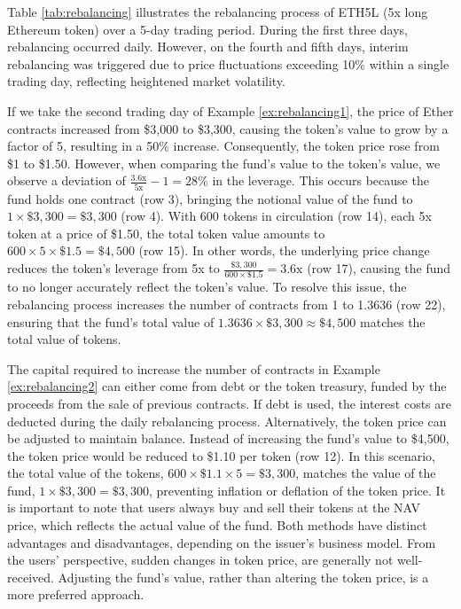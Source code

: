 \begin{example}\label{ex:rebalancing1}
	Table \ref{tab:rebalancing} illustrates the rebalancing process of ETH5L (5x long Ethereum token) over a 5-day trading period. During the first three days, rebalancing occurred daily. However, on the fourth and fifth days, interim rebalancing was triggered due to price fluctuations exceeding 10\% within a single trading day, reflecting heightened market volatility.
\end{example}


\begin{example}\label{ex:rebalancing2}
	If we take the second trading day of Example \ref{ex:rebalancing1}, the price of Ether contracts increased from \$3,000 to \$3,300, causing the token's value to grow by a factor of 5, resulting in a 50\% increase. Consequently, the token price rose from \$1 to \$1.50. However, when comparing the fund's value to the token's value, we observe a deviation of \(\frac{3.6\text{x}}{5\text{x}} - 1 = 28\%\) in the leverage. This occurs because the fund holds one contract (row 3), bringing the notional value of the fund to \(1 \times \$3,300 = \$3,300\) (row 4). With 600 tokens in circulation (row 14), each 5x token at a price of \$1.50, the total token value amounts to \(600 \times 5 \times \$1.5 = \$4,500\) (row 15). In other words, the underlying price change reduces the token's leverage from 5x to \(\frac{\$3,300}{600 \times \$1.5} = 3.6\text{x}\) (row 17), causing the fund to no longer accurately reflect the token's value. To resolve this issue, the rebalancing process increases the number of contracts from 1 to 1.3636 (row 22), ensuring that the fund’s total value of \(1.3636 \times \$3,300 \approx \$4,500\) matches the total value of tokens.
\end{example}

\begin{example}
	The capital required to increase the number of contracts in Example \ref{ex:rebalancing2} can either come from debt or the token treasury, funded by the proceeds from the sale of previous contracts. If debt is used, the interest costs are deducted during the daily rebalancing process. Alternatively, the token price can be adjusted to maintain balance. Instead of increasing the fund's value to \$4,500, the token price would be reduced to \$1.10 per token (row 12). In this scenario, the total value of the tokens, \(600 \times \$1.1 \times 5 = \$3,300\), matches the value of the fund, \(1 \times \$3,300 = \$3,300\), preventing inflation or deflation of the token price. It is important to note that users always buy and sell their tokens at the NAV price, which reflects the actual value of the fund. Both methods have distinct advantages and disadvantages, depending on the issuer's business model. From the users' perspective, sudden changes in token price, are generally not well-received. Adjusting the fund’s value, rather than altering the token price, is a more preferred approach.
\end{example}

